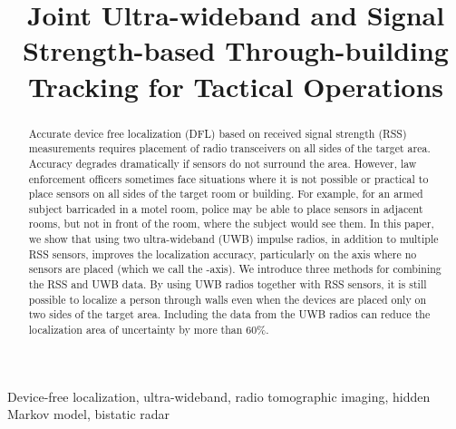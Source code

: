 \documentclass[conference]{IEEEtran}
\begin{document}
\title{Joint Ultra-wideband and Signal Strength-based Through-building Tracking for Tactical Operations}



\author{
}





\maketitle

\thispagestyle{empty}

\begin{abstract}
  Accurate device free localization (DFL) based on received signal
  strength (RSS) measurements requires placement of radio transceivers
  on all sides of the target area.  Accuracy degrades dramatically if
  sensors do not surround the area.  However, law enforcement officers
  sometimes face situations where it is not possible or practical to
  place sensors on all sides of the target room or building. For
  example, for an armed subject barricaded in a motel room, police may
  be able to place sensors in adjacent rooms, but not in front of the
  room, where the subject would see them.  In this paper, we show that
  using two ultra-wideband (UWB) impulse radios, in addition to
  multiple RSS sensors, improves the localization accuracy,
  particularly on the axis where no sensors are placed (which we call
  the -axis). We introduce three methods for combining the RSS and
  UWB data. By using UWB radios together with RSS sensors, it is still
  possible to localize a person through walls even when the devices
  are placed only on two sides of the target area. Including the data
  from the UWB radios can reduce the localization area of uncertainty
  by more than 60\%.
\end{abstract}

\begin{keywords}
Device-free localization, ultra-wideband, radio tomographic imaging, hidden Markov model, bistatic radar
\end{keywords}
\end{document}
